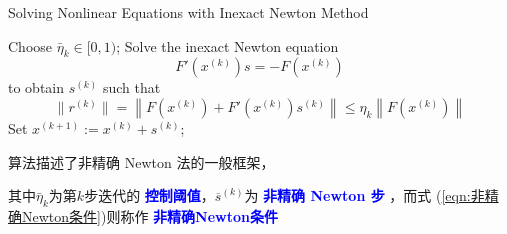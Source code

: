 \documentclass{lzureport}
\begin{document}
\begin{algorithm}
\caption{Solving Nonlinear Equations with Inexact Newton Method}
\begin{algorithmic}[1]
    \State Choose $\bar{\eta}_k \in [0, 1)$;
    \State Solve the inexact Newton equation
    \begin{equation}
        F'\left( x^{(k)} \right) s = -F\left( x^{(k)} \right)
    \end{equation}
    to obtain $s^{(k)}$ such that
    \begin{equation}
        \|r^{(k)}\| = \left\| F\left( x^{(k)} \right) + F'\left( x^{(k)} \right) s^{(k)} \right\| \leq \eta_k \left\| F\left( x^{(k)} \right) \right\|
    \end{equation}\label{eqn:非精确Newton条件}
    \State Set $x^{(k+1)} := x^{(k)} + s^{(k)}$;
\EndFor
\end{algorithmic}
\end{algorithm}

算法描述了非精确 Newton 法的一般框架，

其中$\bar{\eta}_k$为第$k$步迭代的 \textcolor{blue}{\textbf{控制阈值}}，$\overline{s}^{(k)}$为 \textcolor{blue}{\textbf{非精确 Newton 步}} ，而式 (\ref{eqn:非精确Newton条件})则称作 \textcolor{blue}{\textbf{非精确Newton条件}}
\end{document}
